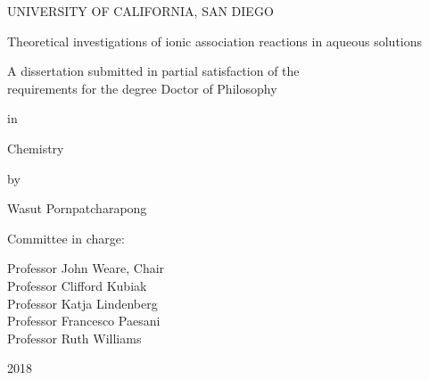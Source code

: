 \frontmatter

\titleformat{\chapter}[block]{\centering}{}{1em}{\MakeUppercase}
\titlespacing*{\chapter}{0pt}{0pt}{1em}

\pagestyle{fancy}
\fancyhf{}
\renewcommand{\headrulewidth}{0pt}
\fancyfoot[CE,CO]{\thepage}



\begin{titlepage}\begin{center}
    UNIVERSITY OF CALIFORNIA, SAN DIEGO

    \vspace{1cm}

    {Theoretical investigations of ionic association reactions in aqueous solutions}

    \vspace{1cm}

    {A dissertation submitted in partial satisfaction of the \\
    requirements for the degree Doctor of Philosophy}

    \vspace{1.3cm}

    in

    \vspace{0.7cm}

    Chemistry

    \vspace{1.3cm}

    by

    \vspace{0.7cm}

    Wasut Pornpatcharapong
\end{center}

\vspace{1.3cm}

\noindent Committee in charge:

\noindent\hspace{0.5in} Professor John Weare, Chair \\
\noindent\hspace*{0.5in} Professor Clifford Kubiak \\
\noindent\hspace*{0.5in} Professor Katja Lindenberg \\
\noindent\hspace*{0.5in} Professor Francesco Paesani \\
\noindent\hspace*{0.5in} Professor Ruth Williams

\vspace{0.7cm}

\begin{center}
    2018
\end{center}\end{titlepage}
